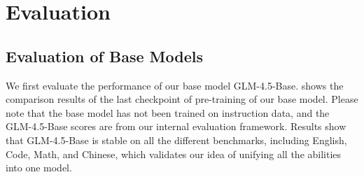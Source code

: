 \documentclass{article}
\theoremstyle{definition}
\begin{document}
\section{Evaluation}
\label{sec:evaluation}
\subsection{Evaluation of Base Models}
We first evaluate the performance of our base model GLM-4.5-Base.  shows the comparison results of the last checkpoint of pre-training of our base model. Please note that the base model has not been trained on instruction data, and the GLM-4.5-Base scores are from our internal evaluation framework.
Results show that GLM-4.5-Base is stable on all the different benchmarks, including English, Code, Math, and Chinese, which validates our idea of unifying all the abilities into one model.
\end{document}

